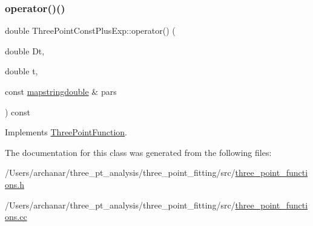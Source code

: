 \subsubsection{\texorpdfstring{operator()()}{operator()()}\hspace{0.1cm}{\footnotesize\ttfamily [2/2]}}
{\footnotesize\ttfamily double Three\+Point\+Const\+Plus\+Exp\+::operator() (\begin{DoxyParamCaption}\item[{double}]{Dt,  }\item[{double}]{t,  }\item[{const \mbox{\hyperlink{lib_2fitting__lib_2includes_8h_a647b481c557c7966517f753340a81d13}{mapstringdouble}} \&}]{pars }\end{DoxyParamCaption}) const\hspace{0.3cm}{\ttfamily [virtual]}}



Implements \mbox{\hyperlink{classThreePointFunction_aa8a937bb564124ba5852898cd47e9fb3}{Three\+Point\+Function}}.



The documentation for this class was generated from the following files\+:\begin{DoxyCompactItemize}
\item 
/\+Users/archanar/three\+\_\+pt\+\_\+analysis/three\+\_\+point\+\_\+fitting/src/\mbox{\hyperlink{three__point__functions_8h}{three\+\_\+point\+\_\+functions.\+h}}\item 
/\+Users/archanar/three\+\_\+pt\+\_\+analysis/three\+\_\+point\+\_\+fitting/src/\mbox{\hyperlink{three__point__functions_8cc}{three\+\_\+point\+\_\+functions.\+cc}}\end{DoxyCompactItemize}
